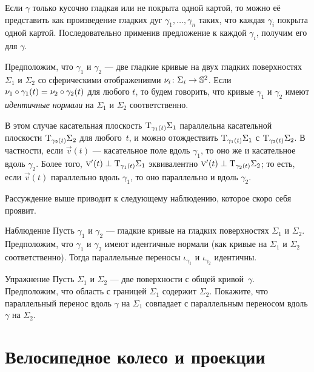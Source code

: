 Если $\gamma$ только кусочно гладкая или не покрыта одной картой, то можно её представить как произведение гладких дуг $\gamma_1,\dots,\gamma_n$ таких, что каждая $\gamma_i$ покрыта одной картой.
Последовательно применив предложение к каждой $\gamma_i$, получим его для $\gamma$.
\qeds


Предположим, что $\gamma_1$ и $\gamma_2$ --- две гладкие кривые на двух гладких поверхностях $\Sigma_1$ и $\Sigma_2$ со сферическими отображениями $\nu_i\colon\Sigma_i\to\mathbb{S}^2$.
Если $\nu_1\circ\gamma_1(t)= \nu_2\circ\gamma_2(t)$ для любого $t$, то будем говорить, что кривые $\gamma_1$ и $\gamma_2$ имеют \emph{идентичные нормали} на $\Sigma_1$ и $\Sigma_2$ соответственно.

В этом случае касательная плоскость $\mathrm{T}_{\gamma_1(t)}\Sigma_1$ параллельна касательной плоскости $\mathrm{T}_{\gamma_2(t)}\Sigma_2$ для любого~$t$, и можно отождествить $\mathrm{T}_{\gamma_1(t)}\Sigma_1$ с $\mathrm{T}_{\gamma_2(t)}\Sigma_2$.
В частности, если $\vec v(t)$ --- касательное поле вдоль $\gamma_1$,
то оно же и касательное вдоль $\gamma_2$.
Более того, $\text{\sc{v}}'(t)\perp \mathrm{T}_{\gamma_1(t)}\Sigma_1$ эквивалентно $\text{\sc{v}}'(t)\perp \mathrm{T}_{\gamma_2(t)}\Sigma_2$; то есть, если $\vec v(t)$ параллельно вдоль $\gamma_1$,
то оно параллельно и вдоль $\gamma_2$.

Рассуждение выше приводит к следующему наблюдению, которое скоро себя проявит.

\begin{thm}{Наблюдение}\label{obs:parallel=}
Пусть $\gamma_1$ и $\gamma_2$ --- гладкие кривые на гладких поверхностях $\Sigma_1$ и $\Sigma_2$.
Предположим, что $\gamma_1$ и $\gamma_2$ имеют идентичные нормали (как кривые на $\Sigma_1$ и $\Sigma_2$ соответственно).
Тогда параллельные переносы $\iota_{\gamma_1}$ и $\iota_{\gamma_2}$ идентичны. 
\end{thm}

\begin{thm}{Упражнение}\label{ex:parallel-transport-support}
Пусть $\Sigma_1$ и $\Sigma_2$ --- две поверхности с общей кривой~$\gamma$.
Предположим, что область с границей $\Sigma_1$ содержит $\Sigma_2$.
Покажите, что параллельный перенос вдоль $\gamma$ на $\Sigma_1$ 
совпадает с параллельным переносом вдоль $\gamma$ на $\Sigma_2$. 
\end{thm}


\section{Велосипедное колесо и проекции}

